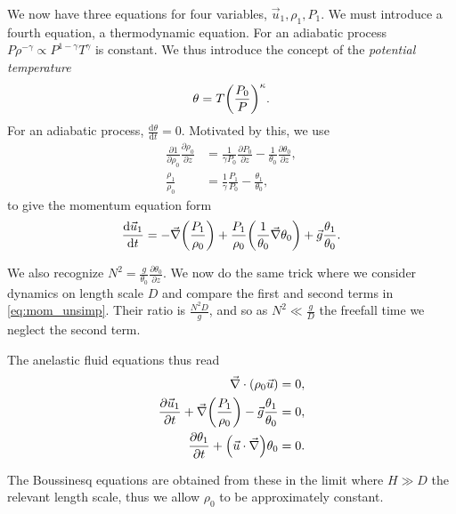 \documentclass[11pt,
        usenames, %
        dvipsnames %
    ]{report}
\newcommand*{\rd}[2]{\frac{\mathrm{d}#1}{\mathrm{d}#2}}
\newcommand*{\pd}[2]{\frac{\partial#1}{\partial#2}}
\DeclarePairedDelimiter\p{\lparen}{\rparen}
\begin{document}
We now have three equations for four variables, $\vec{u}_1, \rho_1, P_1$. We
must introduce a fourth equation, a thermodynamic equation. For an adiabatic
process $P\rho^{-\gamma} \propto P^{1-\gamma}T^\gamma$ is constant. We thus
introduce the concept of the \emph{potential temperature}
\begin{equation}
    \theta = T\p*{\frac{P_0}{P}}^\kappa.
        \label{eq:pot_temp}
\end{equation}
For an adiabatic process, $\rd{\theta}{t} = 0$. Motivated by this, we use
\begin{equation}
    \begin{split}
        \pd{1}{\rho_0}\pd{\rho_0}{z} &= \frac{1}{\gamma P_0}\pd{P_0}{z}
            - \frac{1}{\theta_0}\pd{\theta_0}{z},\\
        \frac{\rho_1}{\rho_0} &= \frac{1}{\gamma} \frac{P_1}{P_0}
            - \frac{\theta_1}{\theta_0},
    \end{split}
\end{equation}
to give the momentum equation form
\begin{equation}
    \rd{\vec{u}_1}{t} = -\vec{\nabla}\p*{\frac{P_1}{\rho_0}}
        + \frac{P_1}{\rho_0}\p*{\frac{1}{\theta_0}\vec{\nabla}\theta_0}
        + \vec{g} \frac{\theta_1}{\theta_0}.\label{eq:mom_unsimp}
\end{equation}

We also recognize $N^2 = \frac{g}{\theta_0}\pd{\theta_0}{z}$. We now do the same
trick where we consider dynamics on length scale $D$ and compare the first and
second terms in \autoref{eq:mom_unsimp}. Their ratio is $\frac{N^2 D}{g}$, and
so as $N^2 \ll \frac{g}{D}$ the freefall time we neglect the second term.

The anelastic fluid equations thus read
\begin{equation}
    \begin{split}
        \vec{\nabla} \cdot \p*{\rho_0\vec{u}} &= 0,\\
        \pd{\vec{u}_1}{t} + \vec{\nabla}\p*{\frac{P_1}{\rho_0}}
            - \vec{g}\frac{\theta_1}{\theta_0} &= 0,\\
        \pd{\theta_1}{t} + \p*{\vec{u} \cdot \vec{\nabla}}\theta_0 &= 0.
    \end{split}\label{eq:lin_anelastic}
\end{equation}

The Boussinesq equations are obtained from these in the limit where $H \gg D$
the relevant length scale, thus we allow $\rho_0$ to be approximately constant.
\end{document}
